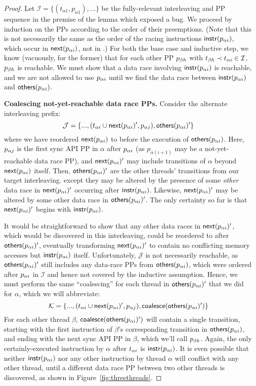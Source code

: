 \begin{proof}
Let $\mathcal{I} = \{(t_{\alpha{}1}, p_{\alpha{}1}), ...\}$ be the fully-relevant interleaving and PP sequence in the premise of the lemma which exposed a bug.
We proceed by induction on the PPs according to the order of their preemptions.
(Note that this is not necessarily the same as the order of the racing instructions $\mathsf{instr}(p_{\alpha{}i})$, which occur in $\mathsf{next}(p_{\alpha{}i})$, not in \tai.)
For both the base case and inductive step, we know (vacuously, for the former) that for each other PP $p_{\beta{}h}$ with $t_{\beta{}h} \prec t_{\alpha{}i} \in \mathcal{I}$, $p_{\beta{}h}$ is reachable.
We must show that a data race involving $\mathsf{instr}(p_{\alpha{}i})$
is reachable, and we are not allowed to use $p_{\alpha{}i}$ until we find the data race between $\mathsf{instr}(p_{\alpha{}i})$ and $\mathsf{others}(p_{\alpha{}i})$.

{\bf Coalescing not-yet-reachable data race PPs.}
Consider the alternate interleaving prefix:
\[
	\mathcal{J} = \{..., (t_{\alpha{}i} \cup \mathsf{next}(p_{\alpha{}i})', p_{\alpha{}j}), \mathsf{others}(p_{\alpha{}i})' \}
\]
where we have reordered $\mathsf{next}(p_{\alpha{}i})$ to before the execution of $\mathsf{others}(p_{\alpha{}i})$.
Here, $p_{\alpha{}j}$ is the first sync API PP in $\alpha$ after $p_{\alpha{}i}$ (as $p_{\alpha(i+1)}$ may be a not-yet-reachable data race PP),
and $\mathsf{next}(p_{\alpha{}i})'$ may include transitions of $\alpha$ beyond $\mathsf{next}(p_{\alpha{}i})$ itself.
Then, $\mathsf{others}(p_{\alpha{}i})'$ are the other threads' transitions from our target interleaving.
except they may be altered by the presence of some {\em other} data race in $\mathsf{next}(p_{\alpha{}i})'$ occurring after $\mathsf{instr}(p_{\alpha{}i})$.
Likewise, $\mathsf{next}(p_{\alpha{}i})'$ may be altered by some other data race in $\mathsf{others}(p_{\alpha{}i})'$.
The only certainty so far is that $\mathsf{next}(p_{\alpha{}i})'$ begins with $\mathsf{instr}(p_{\alpha{}i})$.

It would be straightforward to show that any other data races in $\mathsf{next}(p_{\alpha{}i})'$, which would be discovered in this interleaving,
could be reordered to after $\mathsf{others}(p_{\alpha{}i})'$,
eventually transforming $\mathsf{next}(p_{\alpha{}i})'$ to contain no conflicting memory accesses but $\mathsf{instr}(p_{\alpha{}i})$ itself.
Unfortunately, $\mathcal{J}$ is not necessarily reachable, as $\mathsf{others}(p_{\alpha{}i})'$ still includes any data-race PPs from $\mathsf{others}(p_{\alpha{}i})$,
which were ordered after $p_{\alpha{}i}$ in $\mathcal{I}$ and hence not covered by the inductive assumption.
Hence, we must perform the same ``coalescing'' for each thread in $\mathsf{others}(p_{\alpha{}i})'$ that we did for $\alpha$,
which we will abbreviate:
\[
	\mathcal{K} = \{..., (t_{\alpha{}i} \cup \mathsf{next}(p_{\alpha{}i})', p_{\alpha{}j}), \mathsf{coalesce}(\mathsf{others}(p_{\alpha{}i})') \}
\]
For each other thread $\beta$, $\mathsf{coalesce}(\mathsf{others}(p_{\alpha{}i})')$ will contain a single transition,
starting with the first instruction of $\beta$'s corresponding transition in $\mathsf{others}(p_{\alpha{}i})$,
and ending with the next sync API PP in $\beta$, which we'll call $p_{\beta{}k}$.
Again, the only certainly-executed instruction by $\alpha$ after $t_{\alpha{}i}$ is $\mathsf{instr}(p_{\alpha{}i})$.
It is even possible that neither $\mathsf{instr}(p_{\alpha{}i})$ nor any other instruction by thread $\alpha$ will conflict with any other thread,
until a different data race PP between two other threads is discovered,
as shown in Figure~\ref{fig:threethreads}.


\end{proof}
